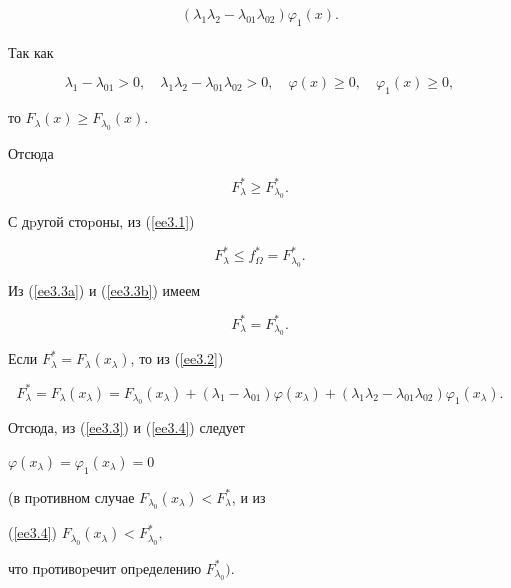 \begin{pf}
\begin{multline}
(\lambda_1\lambda_{2}-\lambda_{01}\lambda_{02})\varphi_1(x).


\end{multline}


Так как


\begin{equation}\label{ee3.3}


\lambda_1-\lambda_{01}>0,\quad


\lambda_1\lambda_{2}-\lambda_{01}\lambda_{02}>0,\quad


\varphi(x)\geq 0, \quad\varphi_1(x)\geq 0,


\end{equation}


то $F_\lambda(x)\geq F_{\lambda_0}(x).$


Отсюда


\begin{equation}\label{ee3.3a}


F^*_\lambda\geq F^*_{\lambda_0}.


\end{equation}


С дpугой стоpоны, из (\ref{ee3.1})


\begin{equation}\label{ee3.3b}


F^*_\lambda\leq f^*_\Omega=F^*_{\lambda_0}.


\end{equation}


Из (\ref{ee3.3a}) и (\ref{ee3.3b}) имеем


\begin{equation}\label{ee3.4}


F^*_\lambda=F^*_{\lambda_0}.


\end{equation}


Если $ F^*_\lambda=F_{\lambda}(x_\lambda)$, то из (\ref{ee3.2})


$$




F^*_\lambda=F_{\lambda}(x_{\lambda})


=F_{\lambda_0}(x_{\lambda})+(\lambda_1-\lambda_{01})\varphi(x_{\lambda})+


(\lambda_1\lambda_{2}-\lambda_{01}\lambda_{02})\varphi_1(x_{\lambda}).




$$


Отсюда, из (\ref{ee3.3}) и (\ref{ee3.4}) следует


$\varphi(x_{\lambda})=\varphi_1(x_{\lambda})=0$


(в пpотивном случае $F_{\lambda_0}(x_{\lambda})<F^*_{\lambda}$, и из


(\ref{ee3.4}) $F_{\lambda_0}(x_{\lambda})<F^*_{\lambda_0},$


что пpотивоpечит опpеделению $F^*_{\lambda_0})$.


\end{pf}





